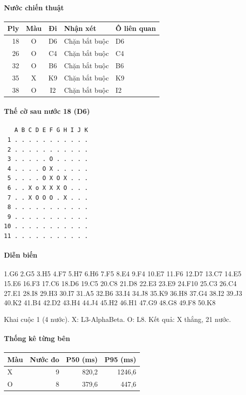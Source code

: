 \paragraph{Nước chiến thuật}
\begin{center}\small
\begin{tabular}{@{}rccll@{}}
\toprule
Ply & Màu & Đi & Nhận xét & Ô liên quan \\
\midrule
18 & O & D6 & Chặn bắt buộc & D6 \\
26 & O & C4 & Chặn bắt buộc & C4 \\
32 & O & B6 & Chặn bắt buộc & B6 \\
35 & X & K9 & Chặn bắt buộc & K9 \\
38 & O & I2 & Chặn bắt buộc & I2 \\
\bottomrule
\end{tabular}
\end{center}
\paragraph{Thế cờ sau nước 18 (D6)}
\begin{verbatim}
   A B C D E F G H I J K
 1 . . . . . . . . . . .
 2 . . . . . . . . . . .
 3 . . . . . O . . . . .
 4 . . . . O X . . . . .
 5 . . . . O X O X . . .
 6 . . X o X X X O . . .
 7 . . X O O O . X . . .
 8 . . . . . . . . . . .
 9 . . . . . . . . . . .
10 . . . . . . . . . . .
11 . . . . . . . . . . .
\end{verbatim}
\paragraph{Diễn biến}
{\footnotesize 1.G6 2.G5 3.H5 4.F7 5.H7 6.H6 7.F5 8.E4 9.F4 10.E7 11.F6 12.D7 13.C7 14.E5 15.E6 16.F3 17.C6 18.D6 19.C5 20.C8 21.D8 22.E3 23.E9 24.F10 25.C3 26.C4 27.E1 28.I8 29.H3 30.I7 31.A5 32.B6 33.I4 34.J8 35.K9 36.H8 37.G4 38.I2 39.J3 40.K2 41.B4 42.D2 43.H4 44.J4 45.H2 46.H1 47.G9 48.G8 49.F8 50.K8\par}
Khai cuộc 1 (4 nước). X: L3-AlphaBeta. O: L8. Kết quả: X thắng, 21 nước.
\paragraph{Thống kê từng bên}
\begin{center}\small
\begin{tabular}{@{}lrrr@{}}
\toprule
Màu & Nước đo & P50 (ms) & P95 (ms) \\
\midrule
X & 9 & 820,2 & 1246,6 \\
O & 8 & 379,6 & 447,6 \\
\bottomrule
\end{tabular}
\end{center}
